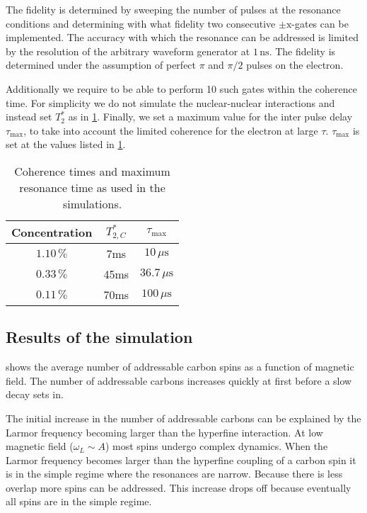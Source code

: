 The fidelity is determined by sweeping the number of pulses at the resonance conditions and determining with what fidelity two consecutive $\pm \mathrm{x}$-gates can be implemented.
The accuracy with which the resonance can be addressed is limited by the resolution of the arbitrary waveform generator at $1\,\mathrm{ns}$.
The fidelity is determined under the assumption of perfect $\pi$ and $\pi/2$ pulses on the electron.

Additionally we require to be able to perform 10 such gates within the coherence time.
For simplicity we do not simulate the nuclear-nuclear interactions and instead set $T_2^*$ as in \cref{tbl:concentration_Tmaxes}.
Finally, we set a maximum value for the inter pulse delay $\tau_{\mathrm{max}}$, to take into account the limited coherence for the electron at large $\tau$.
$\tau_{\mathrm{max}}$ is set at the values listed in \cref{tbl:concentration_Tmaxes}.
\begin{table}[htbp]
    \centering
    \caption{Coherence times and maximum resonance time as used in the simulations.}
    \begin{tabular}{ccc}
    Concentration &  $  T_{2,C}^* $ & $  \tau_{\mathrm{max} }$ \\ \hline
    $1.10\,\% $&  7ms & $10\,\mu\mathrm{s}$\\
    $0.33\,\% $&  45ms & $36.7\,\mu\mathrm{s}$\\
    $0.11\,\% $&  70ms & $100\,\mu\mathrm{s}$\\
    \end{tabular}
    \label{tbl:concentration_Tmaxes}
\end{table}

\subsection{Results of the simulation}
 shows the average number of addressable carbon spins as a function of magnetic field.
The number of addressable carbons increases quickly at first before a slow decay sets in.

The initial increase in the number of addressable carbons can be explained by the Larmor frequency becoming larger than the hyperfine interaction.
At low magnetic field ($\omega_L \sim A$) most spins undergo complex dynamics.
When the Larmor frequency becomes larger than the hyperfine coupling of a carbon spin it is in the simple regime where the resonances are narrow.
Because there is less overlap more spins can be addressed.
This increase drops off because eventually all spins are in the simple regime.


